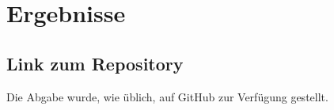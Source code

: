
\section{Ergebnisse}
\label{sec:Ergebnisse}


\subsection{Link zum Repository}
\label{subsec:Link zum Repository}
Die Abgabe wurde, wie üblich, auf GitHub zur Verfügung gestellt. \cite{GitHub-Repo}
\newpage